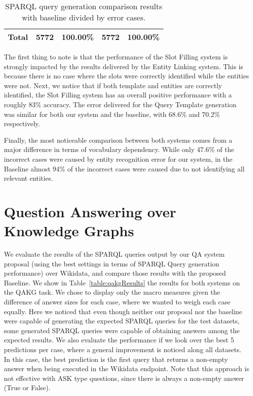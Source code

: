 \begin{table}[h!]
\begin{tabular}{|ccc|cc|cc|}
    \multicolumn{3}{|c|}{\textbf{Total}}                                                                                                                 & 5772                                                                                     & 100.00\%                                                       & 5772                                                                                     & 100.00\%                                                       \\ \hline
    \end{tabular}
    \caption{SPARQL query generation comparison results with baseline divided by error cases.}
    \label{table:queryGenerationErrorRatio}
\end{table}

The first thing to note is that the performance of the Slot Filling system is strongly impacted 
by the results delivered by the Entity Linking system. This is because there is no case where the 
slots were correctly identified while the entities were not. Next, we notice that if both 
template and entities are correctly identified, the Slot Filling system has an overall positive 
performance with a roughly 83\% accuracy. The error delivered for the Query Template generation 
was similar for both our system and the baseline, with 68.6\% and 70.2\% respectively.

Finally, the most noticeable comparison between both systems comes from a major difference in 
terms of vocabulary dependency. While only 47.6\% of the incorrect cases were caused by entity 
recognition error for our system, in the Baseline almost 94\% of the incorrect cases were caused 
due to not identifying all relevant entities.

\section{Question Answering over Knowledge Graphs}
\label{cap5:results/questionAnsweringKG}
We evaluate the results of the SPARQL queries output by our QA system proposal (using the best 
settings in terms of SPARQL Query generation performance) over Wikidata, and compare those results 
with the proposed Baseline. We show in Table~\ref{table:qakgResults} the results for both systems 
on  the QAKG task. We chose to display only the macro measures given the difference of answer 
sizes for each case, where we wanted to weigh each case equally. Here we noticed that even though 
neither our proposal nor the baseline were capable of generating the expected SPARQL queries for 
the test datasets, some generated SPARQL queries were capable of obtaining answers among the 
expected results. We also evaluate the performance if we look over the best 5 predictions per 
case, where a general improvement is noticed along all datasets. In this case, the best prediction 
is the first query that returns a non-empty answer when being executed in the Wikidata endpoint. 
Note that this approach is not effective with ASK type questions, since there is always a 
non-empty answer (True or False).